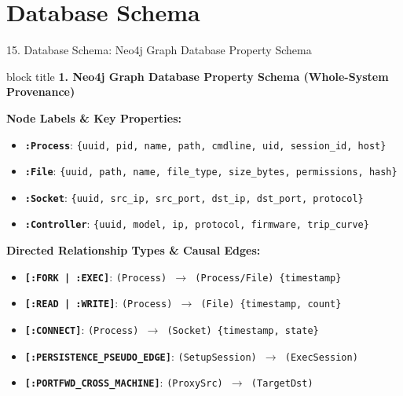 \documentclass[aspectratio=169,10pt]{beamer}
\begin{document}
\section{Database Schema}

\begin{frame}{15. Database Schema: Neo4j Graph Database Property Schema}
\vspace{0.3em}
\begin{beamercolorbox}[rounded=true,shadow=false,sep=0.45em,wd=\textwidth]{block title}
\textbf{\scriptsize 1. Neo4j Graph Database Property Schema (Whole-System Provenance)}
\end{beamercolorbox}
\vspace{0.3em}
{\fontsize{7.8pt}{11.2pt}\selectfont
\textbf{Node Labels \& Key Properties:}
\begin{itemize}\itemsep0.30em
  \item \textbf{\texttt{:Process}}: \texttt{\{uuid, pid, name, path, cmdline, uid, session\_id, host\}}
  \item \textbf{\texttt{:File}}: \texttt{\{uuid, path, name, file\_type, size\_bytes, permissions, hash\}}
  \item \textbf{\texttt{:Socket}}: \texttt{\{uuid, src\_ip, src\_port, dst\_ip, dst\_port, protocol\}}
  \item \textbf{\texttt{:Controller}}: \texttt{\{uuid, model, ip, protocol, firmware, trip\_curve\}}
\end{itemize}
\vspace{0.3em}
\textbf{Directed Relationship Types \& Causal Edges:}
\begin{itemize}\itemsep0.30em
  \item \textbf{\texttt{[:FORK | :EXEC]}}: \texttt{(Process) $\rightarrow$ (Process/File) \{timestamp\}}
  \item \textbf{\texttt{[:READ | :WRITE]}}: \texttt{(Process) $\rightarrow$ (File) \{timestamp, count\}}
  \item \textbf{\texttt{[:CONNECT]}}: \texttt{(Process) $\rightarrow$ (Socket) \{timestamp, state\}}
  \item \textbf{\texttt{[:PERSISTENCE\_PSEUDO\_EDGE]}}: \texttt{(SetupSession) $\rightarrow$ (ExecSession)}
  \item \textbf{\texttt{[:PORTFWD\_CROSS\_MACHINE]}}: \texttt{(ProxySrc) $\rightarrow$ (TargetDst)}
\end{itemize}
}
\end{frame}
\end{document}
